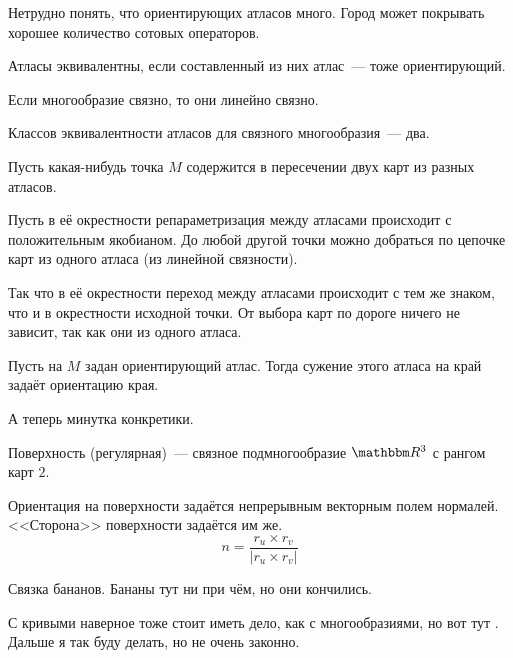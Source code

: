 \documentclass[draft,timbord]{longnotes}
\begin{document}
Нетрудно понять, что ориентирующих атласов много. Город может покрывать
хорошее количество сотовых операторов.

\begin{defn}\label{defn:dg::orient::atleq}
  Атласы эквивалентны, если составленный из них атлас~--- тоже ориентирующий.
\end{defn}

\begin{prop}\label{prop:dg::orient::conn}
  Если многообразие связно, то они линейно связно.
\end{prop}
\begin{prop}\label{prop:dg::orient::atlbin}
  Классов эквивалентности атласов для связного многообразия~--- два.
\end{prop}
\begin{lproof}[\quest]
  Пусть какая-нибудь точка $M$ содержится в пересечении двух карт из разных атласов.

  Пусть в её окрестности репараметризация между атласами происходит с положительным якобианом.
  До любой другой точки можно добраться по цепочке карт из одного атласа (из линейной связности).

  Так что в её окрестности переход между атласами происходит с тем же знаком, что и в окрестности
  исходной точки. От выбора карт по дороге ничего не зависит, так как они из одного атласа.
\end{lproof}

\begin{defn}\label{defn:dg::orient::edge}
  Пусть на $M$ задан ориентирующий атлас. 
  Тогда сужение этого атласа на край задаёт ориентацию края.
\end{defn}

А теперь минутка конкретики. 
\begin{defn}\label{defn:dg::orient::surf}
  Поверхность (регулярная)~--- связное \quest подмногообразие $\R^3$ с рангом карт $2$.
\end{defn}

\begin{prop}\label{prop:dg::orient::surfnorm}
  Ориентация на поверхности задаётся непрерывным векторным полем нормалей.
  <<Сторона>> поверхности задаётся им же.
  \[
    n= \frac{r_u \times r_v }{|r_u \times r_v|} 
  \]
\end{prop}
\begin{lproof}
  Связка бананов. Бананы тут ни при чём, но они кончились.
\end{lproof}

\begin{rem}\label{rem:dg::orient::curvesfolds}
  С кривыми наверное тоже стоит иметь дело, как с многообразиями, но вот тут \quest.
  Дальше я так буду делать, но не очень законно.
\end{rem}
\end{document}
